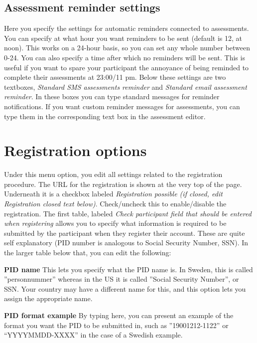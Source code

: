 \documentclass[]{book}
\begin{document}
\hypertarget{assessment-reminder-settings}{%
\section{Assessment reminder settings}\label{assessment-reminder-settings}}

Here you specify the settings for automatic reminders connected to assessments. You can specify at what hour you want reminders to be sent (default is 12, at noon). This works on a 24-hour basis, so you can set any whole number between 0-24.
You can also specify a time after which no reminders will be sent. This is useful if you want to spare your participant the annoyance of being reminded to complete their assessments at 23:00/11 pm.
Below these settings are two textboxes, \emph{Standard SMS assessments reminder} and \emph{Standard email assessment reminder}. In these boxes you can type standard messages for reminder notifications. If you want custom reminder messages for assessments, you can type them in the corresponding text box in the assessment editor.

\hypertarget{registration-options}{%
\chapter{Registration options}\label{registration-options}}

Under this menu option, you edit all settings related to the registration procedure. The URL for the registration is shown at the very top of the page. Underneath it is a checkbox labeled \emph{Registration possible (if closed, edit Registration closed text below)}. Check/uncheck this to enable/disable the registration.
The first table, labeled \emph{Check participant field that should be entered when registering} allows you to specify what information is required to be submitted by the participant when they register their account. These are quite self explanatory (PID number is analogous to Social Security Number, SSN).
In the larger table below that, you can edit the following:

\textbf{PID name}
This lets you specify what the PID name is. In Sweden, this is called ''personnummer'' whereas in the US it is called ''Social Security Number'', or SSN. Your country may have a different name for this, and this option lets you assign the appropriate name.

\textbf{PID format example}
By typing here, you can present an example of the format you want the PID to be submitted in, such as ''19001212-1122'' or ``YYYYMMDD-XXXX'' in the case of a Swedish example.
\end{document}
